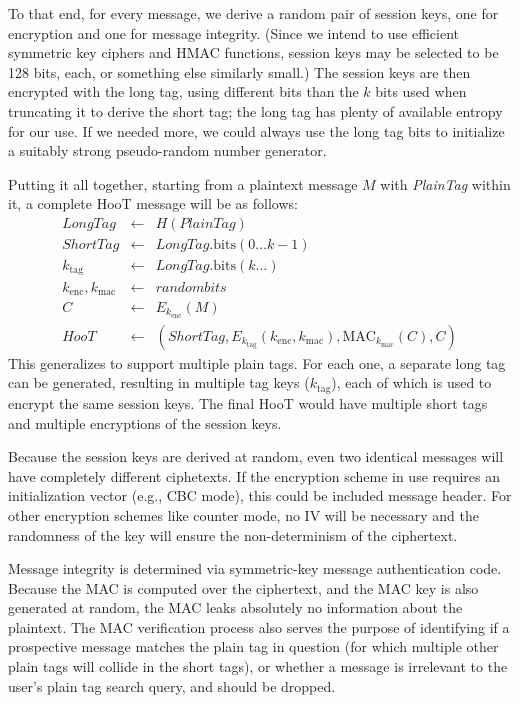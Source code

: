 To that end, for every message, we derive a random pair of session keys, one for encryption and one for message integrity. (Since we intend to use efficient symmetric key ciphers and HMAC functions, session keys may be selected to be 128 bits, each, or something else similarly small.) The session keys are then encrypted with the long tag, using different bits than the $k$ bits used when truncating it to derive the short tag; the long tag has plenty of available entropy for our use. If we needed more, we could always use the long tag bits to initialize a suitably strong pseudo-random number generator.

Putting it all together, starting from a plaintext message $M$ with {\em PlainTag} within it, a complete HooT message will be as follows:
%
\begin{eqnarray*}
\mathit{LongTag} & \leftarrow & H(\mathit{PlainTag}) \\
\mathit{ShortTag} & \leftarrow & \mathit{LongTag}.\mathrm{bits}(0 \ldots k-1) \\
k_{\mathrm{tag}} & \leftarrow & \mathit{LongTag}.\mathrm{bits}(k \ldots) \\
k_{\mathrm{enc}}, k_{\mathrm{mac}} & \leftarrow & \mathit{random bits} \\
C & \leftarrow & E_{k_{\mathrm{enc}}}(M) \\
\mathit{HooT}  & \leftarrow &  \left(\mathit{ShortTag}, E_{k_{\mathrm{tag}}} \left(k_{\mathrm{enc}}, k_{\mathrm{mac}}\right), \mathrm{MAC}_{k_{\mathrm{mac}}}(C), C\right)
\end{eqnarray*}
%
This generalizes to support multiple plain tags. For each one, a separate long tag can be generated, resulting in multiple tag keys ($k_\mathrm{tag}$), each of which is used to encrypt the same session keys. The final HooT would have multiple short tags and multiple encryptions of the session keys.

Because the session keys are derived at random, even two identical messages will have completely different ciphetexts. If the encryption scheme in use requires an initialization vector (e.g., CBC mode), this could be included message header. For other encryption schemes like counter mode, no IV will be necessary and the randomness of the key will ensure the non-determinism of the ciphertext.

Message integrity is determined via symmetric-key message authentication code. Because the MAC is computed over the ciphertext, and the MAC key is also generated at random, the MAC leaks absolutely no information about the plaintext. The MAC verification process also serves the purpose of identifying if a prospective message matches the plain tag in question (for which multiple other plain tags will collide in the short tags), or whether a message is irrelevant to the user's plain tag search query, and should be dropped.

